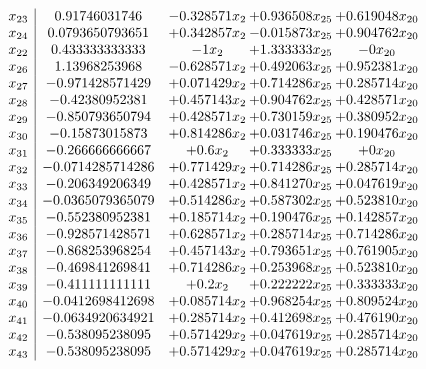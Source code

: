 \documentclass[11pt]{article}
\begin{document}
\[\begin{array}{c| c c@{\hskip 2pt} c@{\hskip 2pt} c@{\hskip 2pt} }
 x_{23}   &  0.91746031746 & -0.328571 x_{2} & + 0.936508 x_{25} & + 0.619048 x_{20}\\
 x_{24}   &  0.0793650793651 & + 0.342857 x_{2} & -0.015873 x_{25} & + 0.904762 x_{20}\\
 x_{22}   &  0.433333333333 & -1 x_{2} & + 1.333333 x_{25} & -0 x_{20}\\
 x_{26}   &  1.13968253968 & -0.628571 x_{2} & + 0.492063 x_{25} & + 0.952381 x_{20}\\
 x_{27}   &  -0.971428571429 & + 0.071429 x_{2} & + 0.714286 x_{25} & + 0.285714 x_{20}\\
 x_{28}   &  -0.42380952381 & + 0.457143 x_{2} & + 0.904762 x_{25} & + 0.428571 x_{20}\\
 x_{29}   &  -0.850793650794 & + 0.428571 x_{2} & + 0.730159 x_{25} & + 0.380952 x_{20}\\
 x_{30}   &  -0.15873015873 & + 0.814286 x_{2} & + 0.031746 x_{25} & + 0.190476 x_{20}\\
 x_{31}   &  -0.266666666667 & + 0.6 x_{2} & + 0.333333 x_{25} & + 0 x_{20}\\
 x_{32}   &  -0.0714285714286 & + 0.771429 x_{2} & + 0.714286 x_{25} & + 0.285714 x_{20}\\
 x_{33}   &  -0.206349206349 & + 0.428571 x_{2} & + 0.841270 x_{25} & + 0.047619 x_{20}\\
 x_{34}   &  -0.0365079365079 & + 0.514286 x_{2} & + 0.587302 x_{25} & + 0.523810 x_{20}\\
 x_{35}   &  -0.552380952381 & + 0.185714 x_{2} & + 0.190476 x_{25} & + 0.142857 x_{20}\\
 x_{36}   &  -0.928571428571 & + 0.628571 x_{2} & + 0.285714 x_{25} & + 0.714286 x_{20}\\
 x_{37}   &  -0.868253968254 & + 0.457143 x_{2} & + 0.793651 x_{25} & + 0.761905 x_{20}\\
 x_{38}   &  -0.469841269841 & + 0.714286 x_{2} & + 0.253968 x_{25} & + 0.523810 x_{20}\\
 x_{39}   &  -0.411111111111 & + 0.2 x_{2} & + 0.222222 x_{25} & + 0.333333 x_{20}\\
 x_{40}   &  -0.0412698412698 & + 0.085714 x_{2} & + 0.968254 x_{25} & + 0.809524 x_{20}\\
 x_{41}   &  -0.0634920634921 & + 0.285714 x_{2} & + 0.412698 x_{25} & + 0.476190 x_{20}\\
 x_{42}   &  -0.538095238095 & + 0.571429 x_{2} & + 0.047619 x_{25} & + 0.285714 x_{20}\\
 x_{43}   &  -0.538095238095 & + 0.571429 x_{2} & + 0.047619 x_{25} & + 0.285714 x_{20}\\

\end{array}\]
\end{document}
